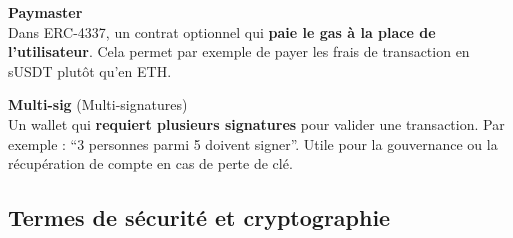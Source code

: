 \documentclass[12pt, a4paper]{article}
\begin{document}
\begin{tcolorbox}[colback=gray!4, colframe=gray!50, breakable]
\vspace{0.4cm}

\textbf{Paymaster}\\
\hspace*{1em} Dans ERC-4337, un contrat optionnel qui \textbf{paie le gas à la place de
l'utilisateur}. Cela permet par exemple de payer les frais de transaction en sUSDT plutôt
qu'en ETH.

\vspace{0.4cm}

\textbf{Multi-sig} (Multi-signatures)\\
\hspace*{1em} Un wallet qui \textbf{requiert plusieurs signatures} pour valider une transaction.
Par exemple : ``3 personnes parmi 5 doivent signer''. Utile pour la gouvernance ou la
récupération de compte en cas de perte de clé.

\end{tcolorbox}

\vspace{0.4cm}

\subsection{Termes de sécurité et cryptographie}
\end{document}
